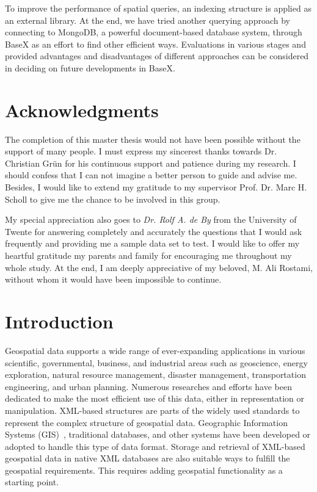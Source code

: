 \documentclass[a4paper,12pt]{article}
\begin{document}
To improve the performance of spatial queries, an indexing structure is applied as an external library.
At the end, we have tried another querying approach by connecting to MongoDB, a powerful document-based database system, through BaseX as an effort to find other efficient ways.
Evaluations in various stages and provided advantages and disadvantages of different approaches can be considered in deciding on future developments in BaseX.
\thispagestyle{empty}

\newpage
\section*{Acknowledgments}
\thispagestyle{empty}

The completion of this master thesis would not have been possible 
without the support of many people. 
I must express my sincerest thanks towards 
Dr. Christian Gr{\"u}n for his continuous support and patience during my research.
I should confess that I can not imagine a better person to guide and advise me. Besides, I would like to extend my gratitude to my supervisor Prof. Dr. Marc H. Scholl to give me the chance to be involved in this group.

My special appreciation also goes to \textit{Dr. Rolf A. de By} from the University of Twente for
answering completely and accurately the questions that I would ask
frequently and providing me a sample data set to test. I would like to offer my heartful gratitude my parents and family for encouraging me 
throughout my whole study. At the end, I am deeply appreciative of my beloved, M. Ali Rostami, without whom it would have been impossible to continue.


\newpage
\tableofcontents

\thispagestyle{empty}
\newpage
\section{Introduction}
\setcounter{page}{1}
Geospatial data supports a wide range of ever-expanding applications in various scientific, governmental, business, and industrial areas such as geoscience, energy exploration, natural resource management, disaster management, transportation engineering, and urban planning. 
Numerous researches and efforts have been dedicated to make the most efficient use of this data, either in representation or manipulation. 
XML-based structures are parts of the widely used standards to represent the complex structure of geospatial data. 
Geographic Information Systems (GIS)~\cite{gis-intro}, traditional databases, and other systems have been developed or adopted to handle this type of data format. 
Storage and retrieval of XML-based geospatial data in native XML databases are also suitable ways to fulfill the geospatial requirements. This requires adding geospatial functionality as a starting point.
\end{document}

